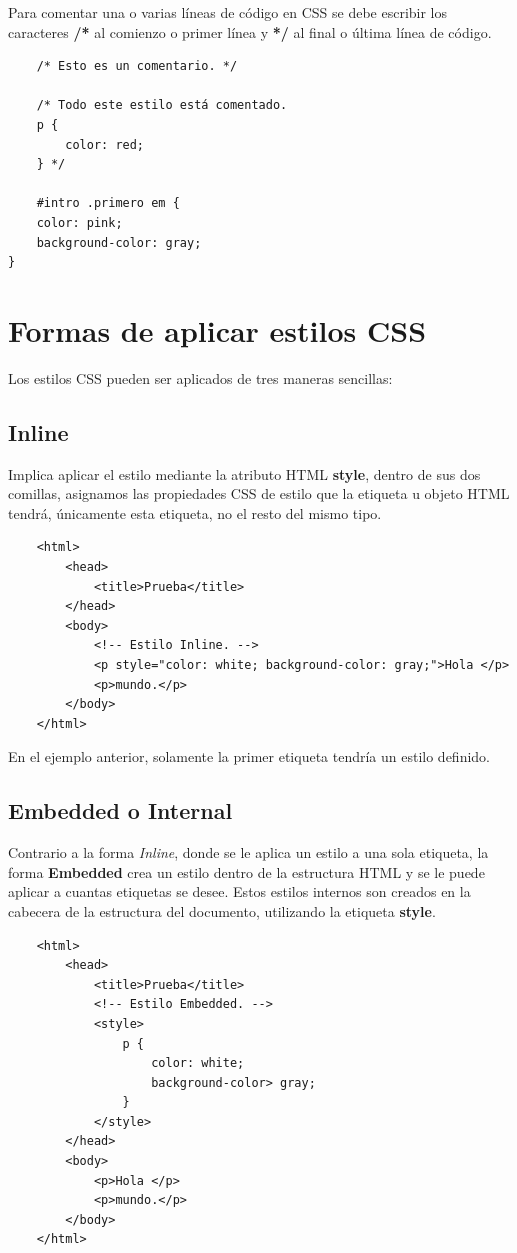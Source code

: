 Para comentar una o varias líneas de código en CSS se debe escribir los caracteres \textbf{/*} al comienzo o primer línea y \textbf{*/} al final o última línea de código.
\begin{lstlisting}
    /* Esto es un comentario. */

    /* Todo este estilo está comentado.
    p {
        color: red;
    } */
    
    #intro .primero em {
    color: pink;
    background-color: gray;
}
\end{lstlisting}



\section{Formas de aplicar estilos CSS}

Los estilos CSS pueden ser aplicados de tres maneras sencillas:


\subsection{Inline}

Implica aplicar el estilo mediante la atributo HTML \textbf{style}, dentro de sus dos comillas, asignamos las propiedades CSS de estilo que la etiqueta u objeto HTML tendrá, únicamente esta etiqueta, no el resto del mismo tipo.
\begin{lstlisting}
    <html>
        <head>
            <title>Prueba</title>
        </head>
        <body>
            <!-- Estilo Inline. -->
            <p style="color: white; background-color: gray;">Hola </p>
            <p>mundo.</p>
        </body>
    </html>
\end{lstlisting}

En el ejemplo anterior, solamente la primer etiqueta tendría un estilo definido.


\subsection{Embedded o Internal}

Contrario a la forma \textit{Inline}, donde se le aplica un estilo a una sola etiqueta, la forma \textbf{Embedded} crea un estilo dentro de la estructura HTML y se le puede aplicar a cuantas etiquetas se desee. Estos estilos internos son creados en la cabecera de la estructura del documento, utilizando la etiqueta \textbf{style}.
\begin{lstlisting}
    <html>
        <head>
            <title>Prueba</title>
            <!-- Estilo Embedded. -->
            <style>
                p {
                    color: white;
                    background-color> gray;
                }
            </style>
        </head>
        <body>
            <p>Hola </p>
            <p>mundo.</p>
        </body>
    </html>
\end{lstlisting}


